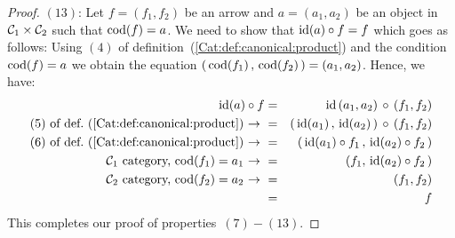 \begin{proof}
    $(13)$: Let $f=(f_{1},f_{2})$ be an arrow and $a=(a_{1},a_{2})$ be an 
    object in $\mbox{${\cal C}_{1}$}\times\mbox{${\cal C}_{2}$}$ such that $\mbox{\rm cod}(f)=a$. We need to show that
    $\mbox{\rm id}(a)\circ f=f$ which goes as follows: Using $(4)$ of 
    definition~(\ref{Cat:def:canonical:product}) and the condition $\mbox{\rm cod}(f)=a$ 
    we obtain the equation $(\,\mbox{\rm cod}(f_{1})\,,\,\mbox{\rm cod}(f_{2})\,)=(a_{1},a_{2})$.
    Hence, we have:
        \begin{eqnarray*}\id(a)\circ f
            &=&\id\,(a_{1},a_{2})\,\circ\,(f_{1},f_{2})\\
            \mbox{$(5)$ of def.~(\ref{Cat:def:canonical:product})\ $\to$\ }
            &=&(\,\id(a_{1})\,,\,\id(a_{2})\,)\,\circ\,(f_{1},f_{2})\\
            \mbox{$(6)$ of def.~(\ref{Cat:def:canonical:product})\ $\to$\ }
            &=&(\,\id(a_{1})\circ f_{1}\,,\,\id(a_{2})\circ f_{2}\,)\\
            \mbox{\Cone\ category, $\cod(f_{1})=a_{1}$\ $\to$\ }
            &=&(f_{1},\,\id(a_{2})\circ f_{2}\,)\\
            \mbox{\Ctwo\ category, $\cod(f_{2})=a_{2}$\ $\to$\ }
            &=&(f_{1},f_{2})\\
            &=&f
        \end{eqnarray*}
This completes our proof of properties~$(7)-(13)$.
\end{proof}
